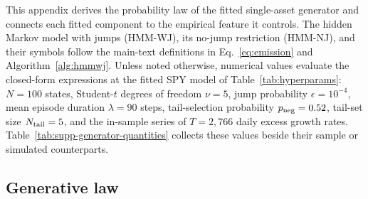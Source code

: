 This appendix derives the probability law of the fitted single-asset
generator and connects each fitted component to the empirical feature
it controls. The hidden Markov model with jumps (HMM-WJ), its no-jump
restriction (HMM-NJ), and their symbols follow the main-text
definitions in Eq.~\eqref{eq:emission} and
Algorithm~\ref{alg:hmmwj}. Unless noted otherwise, numerical values
evaluate the closed-form expressions at the fitted SPY model of
Table~\ref{tab:hyperparams}: $N = 100$ states, Student-$t$ degrees of
freedom $\nu = 5$, jump probability $\epsilon = 10^{-4}$, mean episode
duration $\lambda = 90$ steps, tail-selection probability
$p_{\rm neg} = 0.52$, tail-set size $N_{\rm tail} = 5$, and the
in-sample series of $T = 2{,}766$ daily excess growth rates.
Table~\ref{tab:supp-generator-quantities} collects these values
beside their sample or simulated counterparts.

\begin{table}[H]
\centering
\caption{\textbf{Closed-form quantities of the fitted SPY generator
    against sample and simulated values.} Each closed-form entry
    evaluates the expression named in the text at the fitted SPY
    model of Table~\ref{tab:hyperparams}. Sample values are computed
    from the in-sample SPY series; simulated values use $400$
    in-sample-length paths for the jump-episode quantities and
    $1{,}000$ paths for skewness. For comparison with the
    sup-distance entry, the two-sample Kolmogorov--Smirnov critical
    value at $\alpha = 0.05$ for two samples of $T = 2{,}766$
    observations is $1.358\sqrt{2/T} = 0.0365$. Observed
    autocorrelations are those of the in-sample series shown in
    Fig.~\ref{fig:empirical_motivation}d.}
\label{tab:supp-generator-quantities}
\footnotesize
\resizebox{\textwidth}{!}{}
\end{table}

\subsection{Generative law}
\label{sec:supp-gen-law}

